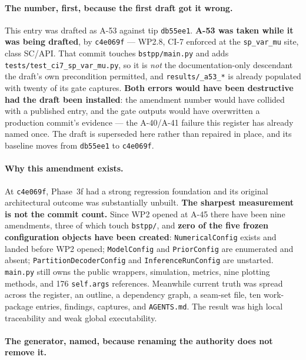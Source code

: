 \documentclass[
  10pt,
]{article}
\begin{document}
\paragraph{The number, first, because the first draft got it wrong.}

This entry was drafted as A-53 against tip \texttt{db55ee1}. \textbf{A-53 was
taken while it was being drafted}, by \texttt{c4e069f} --- WP2.8, CI-7 enforced
at the \texttt{sp\_var\_mu} site, class SC/API. That commit touches
\texttt{bstpp/main.py} and adds \texttt{tests/test\_ci7\_sp\_var\_mu.py}, so it
is \emph{not} the documentation-only descendant the draft's own precondition
permitted, and \texttt{results/\allowbreak{}\_a53\_*} is already populated with
twenty of its gate captures. \textbf{Both errors would have been destructive
had the draft been installed}: the amendment number would have collided with a
published entry, and the gate outputs would have overwritten a production
commit's evidence --- the A-40/A-41 failure this register has already named
once. The draft is superseded here rather than repaired in place, and its
baseline moves from \texttt{db55ee1} to \texttt{c4e069f}.

\paragraph{Why this amendment exists.}

At \texttt{c4e069f}, Phase~3f had a strong regression foundation and its
original architectural outcome was substantially unbuilt. \textbf{The sharpest
measurement is not the commit count.} Since WP2 opened at A-45 there have been
nine amendments, three of which touch \texttt{bstpp/}, and \textbf{zero of the
five frozen configuration objects have been created}: \texttt{NumericalConfig}
exists and landed before WP2 opened; \texttt{ModelConfig} and
\texttt{PriorConfig} are enumerated and absent; \texttt{PartitionDecoderConfig}
and \texttt{InferenceRunConfig} are unstarted. \texttt{main.py} still owns the
public wrappers, simulation, metrics, nine plotting methods, and 176
\texttt{self.args} references. Meanwhile current truth was spread across the
register, an outline, a dependency graph, a seam-set file, ten work-package
entries, findings, captures, and \texttt{AGENTS.md}. The result was high local
traceability and weak global executability.

\paragraph{The generator, named, because renaming the authority does not remove
it.}
\end{document}
